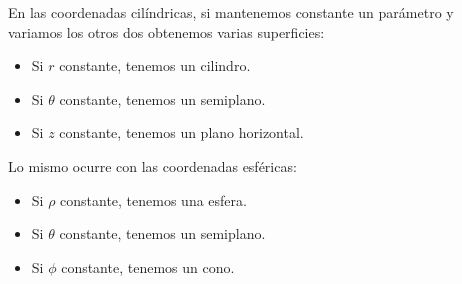 En las coordenadas cilíndricas, si mantenemos constante un parámetro y variamos los otros dos obtenemos varias superficies:

\begin{itemize}
\item Si $r$ constante, tenemos un cilindro. 
\item Si $\theta$ constante, tenemos un semiplano. 
\item Si $z$ constante, tenemos un plano horizontal. 
\end{itemize}

Lo mismo ocurre con las coordenadas esféricas:

\begin{itemize}
\item Si $\rho$ constante, tenemos una esfera. 
\item Si $\theta$ constante, tenemos un semiplano.
\item Si $\phi$ constante, tenemos un cono. 
\end{itemize}